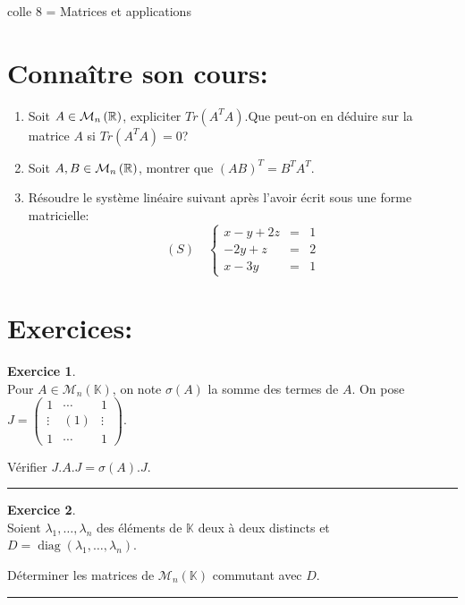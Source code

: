 \documentclass[a4paper,11pt]{article}
\theoremstyle{definition}
\newtheorem{exo}{Exercice} %
\begin{document}
	
	
	\begin{center}
		\Large \sc colle 8 = Matrices et applications
	\end{center}
\raggedright

\section*{Connaître son cours:}
\begin{enumerate}
	\item Soit  $A\in\mathcal{M}_{n}\left(\mathbb{R}\right)$, expliciter $Tr(A^{T}A)$.Que peut-on en déduire sur la matrice $A$ si $Tr(A^{T}A) = 0$?
	\item Soit  $A, B\in\mathcal{M}_{n}\left(\mathbb{R}\right)$, montrer que $(AB)^{T} = B^{T}A^{T}$.  
	\item Résoudre le système linéaire suivant après l'avoir écrit sous une forme matricielle:$$(S)\quad \left\{
	\begin{array}{rcl}
		x-y+2z&=&1\\
		-2y+z&=&2\\
		x-3y&=&1
	\end{array}\right.$$
	
\end{enumerate}

\section*{Exercices:}	


\begin{exo}\textit{}\quad\\[0.25cm]
	Pour $A \in \mathcal{M}_{n}(\mathbb{K})$, on note $\sigma(A)$ la somme des termes de $A$. On pose $J=\left(\begin{array}{ccc}
	1 & \cdots & 1 \\
	\vdots & (1) & \vdots \\
	1 & \cdots & 1
	\end{array}\right) .
	$
	
	\raggedright
	Vérifier $J . A . J=\sigma(A) . J$.
	

	\centering
\rule{1\linewidth}{0.6pt}
\end{exo}
	
	

\begin{exo}\textit{}\quad\\[0.25cm]
	Soient $\lambda_{1}, \ldots, \lambda_{n}$ des éléments de $\mathbb{K}$ deux à deux distincts et $D=\operatorname{diag}\left(\lambda_{1}, \ldots, \lambda_{n}\right)$.
	
	Déterminer les matrices de $\mathcal{M}_{n}(\mathbb{K})$ commutant avec $D$.
	
	
	\centering
	\rule{1\linewidth}{0.6pt}
\end{exo}
\end{document}
